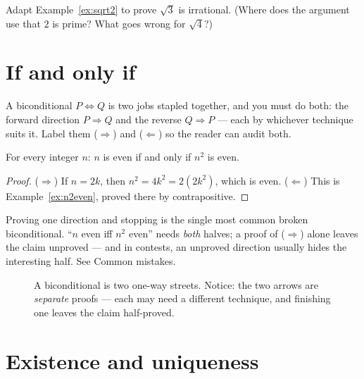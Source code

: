 \begin{exercise}[medium]\label{exr:sqrt3}
Adapt Example~\ref{ex:sqrt2} to prove $\sqrt{3}$ is irrational. (Where does the
argument use that $2$ is prime? What goes wrong for $\sqrt{4}$?)
\end{exercise}

\section{If and only if}\label{sec:iff}

A biconditional $P \iff Q$ is two jobs stapled together, and you must do both:
the forward direction $P \Rightarrow Q$ and the reverse $Q \Rightarrow P$ ---
each by whichever technique suits it. Label them ($\Rightarrow$) and
($\Leftarrow$) so the reader can audit both.

\begin{theorem}\label{thm:neveniff}
For every integer $n$: $n$ is even if and only if $n^2$ is even.
\end{theorem}

\begin{proof}
($\Rightarrow$) If $n = 2k$, then $n^2 = 4k^2 = 2(2k^2)$, which is even.
($\Leftarrow$) This is Example~\ref{ex:n2even}, proved there by contrapositive.
\end{proof}

\begin{tripwire}
Proving one direction and stopping is the single most common broken
biconditional. ``$n$ even iff $n^2$ even'' needs \emph{both} halves; a proof of
($\Rightarrow$) alone leaves the claim unproved --- and in contests, an unproved
direction usually hides the interesting half. See Common mistakes.
\end{tripwire}

\begin{figure}[ht]\centering

\caption{A biconditional is two one-way streets. Notice: the two arrows are
\emph{separate} proofs --- each may need a different technique, and finishing
one leaves the claim half-proved.}
\label{fig:iffproof}
\end{figure}

\section{Existence and uniqueness}\label{sec:existence}

